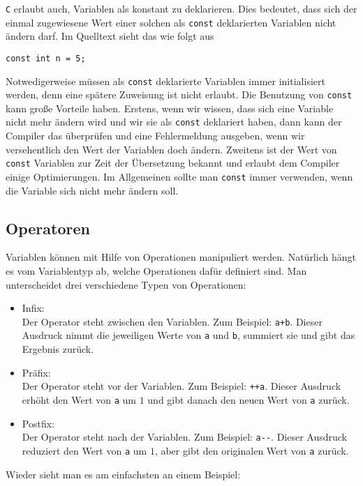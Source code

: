 \texttt{C} erlaubt auch, Variablen als konstant zu deklarieren. 
Dies bedeutet, dass sich der einmal zugewiesene Wert einer solchen als \verb|const| deklarierten Variablen nicht ändern darf.
Im Quelltext sieht das wie folgt aus
\begin{lstlisting}
const int n = 5;
\end{lstlisting}
Notwedigerweise müssen als \verb|const| deklarierte Variablen immer initialisiert werden, denn eine spätere Zuweisung ist nicht erlaubt.
Die Benutzung von \verb|const| kann große Vorteile haben.
Erstens, wenn wir wissen, dass sich eine Variable nicht mehr ändern wird und wir sie als  \verb|const| deklariert haben, dann kann der Compiler das überprüfen und eine Fehlermeldung ausgeben, wenn wir versehentlich den Wert der Variablen doch ändern.
Zweitens ist der Wert von \verb|const| Variablen zur Zeit der Übersetzung bekannt und erlaubt dem Compiler einige Optimierungen.
Im Allgemeinen sollte man \verb|const| immer verwenden, wenn die Variable sich nicht mehr ändern soll.

\subsection{Operatoren} \label{subsec:Operatoren}

Variablen können mit Hilfe von Operationen manipuliert werden.
Natürlich hängt es vom Variablentyp ab, welche Operationen dafür definiert sind.
Man unterscheidet drei verschiedene Typen von Operationen:
\begin{itemize}
\item Infix:\\
  Der Operator steht zwischen den Variablen. Zum Beispiel: \verb|a+b|. 
  Dieser Ausdruck nimmt die jeweiligen Werte von \verb|a| und \verb|b|, summiert sie und gibt das Ergebnis zurück.
\item Präfix:\\
  Der Operator steht vor der Variablen. Zum Beispiel: \verb|++a|. 
  Dieser Ausdruck erhöht den Wert von \verb|a| um $1$ und gibt danach den neuen Wert von \verb|a| zurück.
\item Postfix:\\
  Der Operator steht nach der Variablen. Zum Beispiel: \verb|a--|. 
  Dieser Ausdruck reduziert den Wert von \verb|a| um $1$, aber gibt den originalen Wert von \verb|a| zurück.
\end{itemize}
Wieder sieht man es am einfachsten an einem Beispiel:

